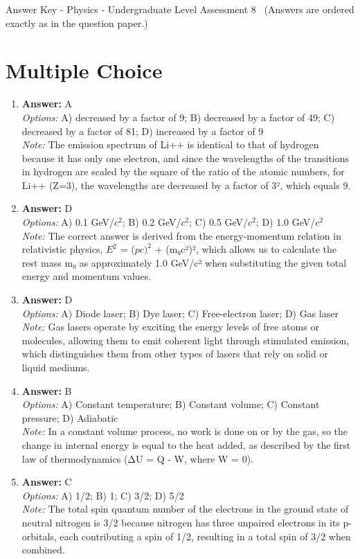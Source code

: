 \documentclass[12pt]{article}
\begin{document}
\begin{center}
Answer Key - Physics - Undergraduate Level Assessment 8 \
\small (Answers are ordered exactly as in the question paper.)
\end{center}

\section*{Multiple Choice}
\begin{enumerate}[label=\arabic*.]
\item \textbf{Answer:} A
\\ \textit{Options:} A) decreased by a factor of 9; B) decreased by a factor of 49; C) decreased by a factor of 81; D) increased by a factor of 9
\\ \textit{Note:} The emission spectrum of Li++ is identical to that of hydrogen because it has only one electron, and since the wavelengths of the transitions in hydrogen are scaled by the square of the ratio of the atomic numbers, for Li++ (Z=3), the wavelengths are decreased by a factor of 3², which equals 9.
\item \textbf{Answer:} D
\\ \textit{Options:} A) 0.1 GeV/$c^2$; B) 0.2 GeV/$c^2$; C) 0.5 GeV/$c^2$; D) 1.0 GeV/$c^2$
\\ \textit{Note:} The correct answer is derived from the energy-momentum relation in relativistic physics, $E^2$ = ($pc)^2$ + (m₀c²)², which allows us to calculate the rest mass m₀ as approximately 1.0 GeV/c² when substituting the given total energy and momentum values.
\item \textbf{Answer:} D
\\ \textit{Options:} A) Diode laser; B) Dye laser; C) Free-electron laser; D) Gas laser
\\ \textit{Note:} Gas lasers operate by exciting the energy levels of free atoms or molecules, allowing them to emit coherent light through stimulated emission, which distinguishes them from other types of lasers that rely on solid or liquid mediums.
\item \textbf{Answer:} B
\\ \textit{Options:} A) Constant temperature; B) Constant volume; C) Constant pressure; D) Adiabatic
\\ \textit{Note:} In a constant volume process, no work is done on or by the gas, so the change in internal energy is equal to the heat added, as described by the first law of thermodynamics (ΔU = Q - W, where W = 0).
\item \textbf{Answer:} C
\\ \textit{Options:} A) 1/2; B) 1; C) 3/2; D) 5/2
\\ \textit{Note:} The total spin quantum number of the electrons in the ground state of neutral nitrogen is 3/2 because nitrogen has three unpaired electrons in its p-orbitals, each contributing a spin of 1/2, resulting in a total spin of 3/2 when combined.
\end{enumerate}
\end{document}

